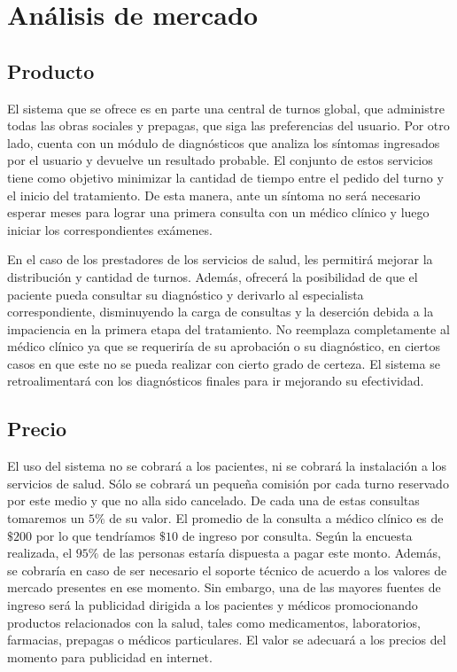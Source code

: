 \documentclass[a4paper,10pt]{article}
\begin{document}
\section{Análisis de mercado}

\subsection{Producto}

El sistema que se ofrece es en parte una central de turnos global, que administre todas las obras sociales y prepagas, que siga las preferencias del usuario. Por otro lado, cuenta con un módulo de diagnósticos que analiza los síntomas ingresados por el usuario y devuelve un resultado probable. El conjunto de estos servicios tiene como objetivo minimizar la cantidad de tiempo entre el pedido del turno y el inicio del tratamiento. De esta manera, ante un síntoma no será necesario esperar meses para lograr una primera consulta con un médico clínico y luego iniciar los correspondientes exámenes.

En el caso de los prestadores de los servicios de salud, les permitirá  mejorar la distribución y cantidad de turnos. Además, ofrecerá la posibilidad de que el paciente pueda consultar su diagnóstico y derivarlo al especialista correspondiente, disminuyendo la carga de consultas y la deserción debida a la impaciencia en la primera etapa del tratamiento. No reemplaza completamente al médico clínico ya que se requeriría de su aprobación o su diagnóstico, en ciertos casos en que este no se pueda realizar con cierto grado de certeza. El sistema se retroalimentará con los diagnósticos finales para ir mejorando su efectividad.


\subsection{Precio}

El uso del sistema no se cobrará a los pacientes, ni se cobrará la instalación a los servicios de salud. Sólo se cobrará un pequeña comisión por cada turno reservado por este medio y que no alla sido
cancelado. De cada una de estas consultas tomaremos un $5\%$ de su valor. 
El promedio de la consulta a médico clínico es de $\$200$ por lo que tendríamos $\$10$ de ingreso por consulta. Según la encuesta realizada, el $95\%$ de las personas estaría dispuesta a pagar este monto. Además, se cobraría en caso de ser necesario el soporte técnico de acuerdo a los valores de mercado presentes en ese momento. 
Sin embargo, una de las mayores fuentes de ingreso será la publicidad dirigida a los pacientes y médicos promocionando productos relacionados con la salud, tales como medicamentos, laboratorios, farmacias, prepagas o médicos particulares. El valor se adecuará a los precios del momento para publicidad en internet.
\end{document}

